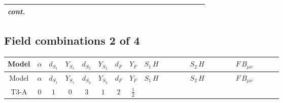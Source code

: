 \documentclass[8pt]{article}
\begin{document}
\begin{landscape}
\begin{longtable}{@{}cccccccc >{\raggedright\arraybackslash}p{0.21\linewidth} >{\raggedright\arraybackslash}p{0.21\linewidth} >{\raggedright\arraybackslash}p{0.21\linewidth}@{}}
\textit{cont.} &  &  &  &  &  &  &  & \scriptsize\adjustbox{max width=\linewidth}{$\begin{gathered} -\frac{2 \hbar  \log \left(\frac{\bar{\mu}^{2}}{m_2^2}\right) \overline{\lambda_5} H_{a_1} H_{a_2} m_2^2 \lambda_5 H_{a_1}{}^{\dagger } H_{a_2}{}^{\dagger }}{\sqrt{3} \left(m_1^2-m_2^2\right)} \\ +\hbar  C_{\text{H2}} H_{a_2} H_{a_1}{}^{\dagger } \mathcal{I}_{H1,a_1,a_2}{}^1\end{gathered}$} &  &  \\
\midrule
\bottomrule
\end{longtable}
\clearpage
\subsection*{Field combinations 2 of 4}
\begin{longtable}{@{}cccccccc >{\raggedright\arraybackslash}p{0.21\linewidth} >{\raggedright\arraybackslash}p{0.21\linewidth} >{\raggedright\arraybackslash}p{0.21\linewidth}@{}}
\toprule
Model & $\alpha$ & $d_{S_1}$ & $Y_{S_1}$ & $d_{S_2}$ & $Y_{S_2}$ & $d_F$ & $Y_F$ & $S_1\,H$ & $S_2\,H$ & $F\,B_{\mu\nu}$ \\
\midrule
\endfirsthead
\toprule
Model & $\alpha$ & $d_{S_1}$ & $Y_{S_1}$ & $d_{S_2}$ & $Y_{S_2}$ & $d_F$ & $Y_F$ & $S_1\,H$ & $S_2\,H$ & $F\,B_{\mu\nu}$ \\
\midrule
\endhead
T3-A & $0$ & $1$ & $0$ & $3$ & $1$ & $2$ & $\frac{1}{2}$ & \scriptsize\adjustbox{max width=\linewidth}{$\begin{gathered} +\frac{\hbar  H_{a_3} H_{a_4} H_{a_1}{}^{\dagger } H_{a_2}{}^{\dagger } \mathcal{I}_{H1,a_1,a_3}{}^1 \mathcal{I}_{H1,a_2,a_4}{}^1 \left(\lambda_{HS_1}^{(1)}^{(1)}\right){}^2}{2 \epsilon } \\ +\frac{1}{2} \hbar  \log \left(\frac{\bar{\mu}^{2}}{m_1^2}\right) H_{a_3} H_{a_4} H_{a_1}{}^{\dagger } H_{a_2}{}^{\dagger } \mathcal{I}_{H1,a_1,a_3}{}^1 \mathcal{I}_{H1,a_2,a_4}{}^1 \left(\lambda_{HS_1}^{(1)}^{(1)}\right){}^2\end{gathered}$} & \scriptsize\adjustbox{max width=\linewidth}{$\begin{gathered} +\frac{3 \hbar  H_{a_1} H_{a_2} H_{a_1}{}^{\dagger } H_{a_2}{}^{\dagger } \left(\lambda_{HS_2}^{(1)}^{(2)}\right){}^2}{2 \epsilon } \\ +\frac{3}{2} \hbar  \log \left(\frac{\bar{\mu}^{2}}{m_2^2}\right) H_{a_1} H_{a_2} H_{a_1}{}^{\dagger } H_{a_2}{}^{\dagger } \left(\lambda_{HS_2}^{(1)}^{(2)}\right){}^2\end{gathered}$} & \scriptsize\adjustbox{max width=\linewidth}{$\begin{gathered} -\frac{1}{2} \hbar  \log \left(\frac{\bar{\mu}^{2}}{M_F^2}\right) B_{\mu _1\mu _2}^2\end{gathered}$} \\
\midrule
\bottomrule
\end{longtable}
\clearpage

\end{landscape}
\end{document}
